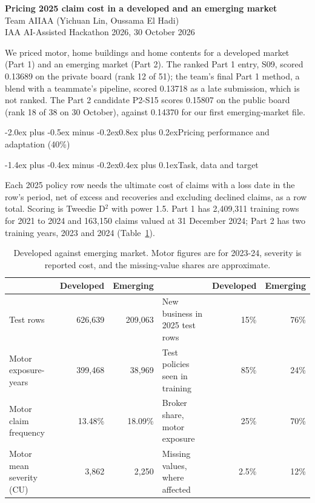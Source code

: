 \documentclass[11pt,a4paper]{article}
\makeatletter
\renewcommand\section{\@startsection{section}{1}{\z@}%
  {-2.0ex plus -0.5ex minus -0.2ex}{0.8ex plus 0.2ex}{\normalfont\large\bfseries}}
\renewcommand\subsection{\@startsection{subsection}{2}{\z@}%
  {-1.4ex plus -0.4ex minus -0.2ex}{0.4ex plus 0.1ex}{\normalfont\normalsize\bfseries}}
\newcommand{\Dsq}{D$^2$}
\makeatother
\begin{document}
\begin{center}
{\Large\bfseries Pricing 2025 claim cost in a developed and an emerging market}\\[4pt]
Team AIIAA (Yichuan Lin, Oussama El Hadi)\\
IAA AI-Assisted Hackathon 2026, 30 October 2026
\end{center}

\noindent We priced motor, home buildings and home contents for a developed market (Part 1) and an emerging market
(Part 2). The ranked Part 1 entry, S09, scored 0.13689 on the private board (rank 12 of 51); the team's final Part 1
method, a blend with a teammate's pipeline, scored 0.13718 as a late submission, which is not ranked. The Part 2
candidate P2-S15 scores 0.15807 on the public board (rank 18 of 38 on 30 October), against 0.14370 for our first
emerging-market file.

\section{Pricing performance and adaptation (40\%)}

\subsection{Task, data and target}

Each 2025 policy row needs the ultimate cost of claims with a loss date in the row's period, net of excess and
recoveries and excluding declined claims, as a row total. Scoring is Tweedie \Dsq{} with power 1.5. Part 1 has
2,409,311 training rows for 2021 to 2024 and 163,150 claims valued at 31 December 2024; Part 2 has two training years,
2023 and 2024 (Table~\ref{tab:markets}).

\begin{table}[htbp]
\centering\small\setlength{\tabcolsep}{3.5pt}
\begin{tabular}{lrr@{\hspace{1em}}lrr}
\toprule
 & Developed & Emerging & & Developed & Emerging\\
\midrule
Test rows & 626,639 & 209,063 & New business in 2025 test rows & 15\% & 76\%\\
Motor exposure-years & 399,468 & 38,969 & Test policies seen in training & 85\% & 24\%\\
Motor claim frequency & 13.48\% & 18.09\% & Broker share, motor exposure & 25\% & 70\%\\
Motor mean severity (CU) & 3,862 & 2,250 & Missing values, where affected & 2.5\% & 12\%\\
\bottomrule
\end{tabular}
\caption{Developed against emerging market. Motor figures are for 2023-24, severity is reported cost, and the
missing-value shares are approximate.}
\label{tab:markets}
\end{table}
\end{document}
